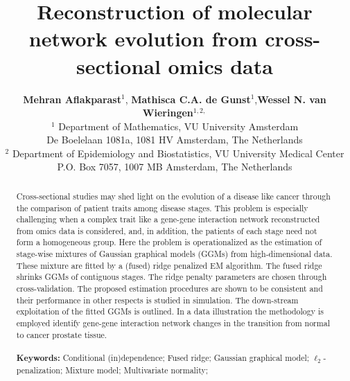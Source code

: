 \documentclass[10pt]{article}
\title{Reconstruction of molecular network evolution from cross-sectional omics data}
\author{ {\small
\textbf{Mehran Aflakparast}$^{1}$, \textbf{Mathisca C.A. de Gunst}$^{1}$,\textbf{Wessel N. van Wieringen}$^{1,2,}$%
}
\\
{\small $^1$ Department of Mathematics, VU University Amsterdam}
\\
{\small De Boelelaan 1081a, 1081 HV Amsterdam, The Netherlands}
\\
{\small $^2$ Department of Epidemiology and Biostatistics, VU University Medical Center}
\\
{\small P.O. Box 7057, 1007 MB Amsterdam, The Netherlands}
}
\date{}
\begin{document}
\maketitle


\begin{abstract}
\noindent
Cross-sectional studies may shed light on the evolution of a disease like cancer through the comparison of patient traits among disease stages. 
This problem is especially challenging when a complex trait like a gene-gene interaction network reconstructed from omics data is considered, and, in addition, the patients of each stage need not form a homogeneous group. Here the problem is operationalized as the estimation of stage-wise mixtures of Gaussian graphical models (GGMs) from high-dimensional data. These mixture are fitted by a (fused) ridge penalized EM algorithm. The fused ridge shrinks GGMs of contiguous stages. The ridge penalty parameters are chosen through cross-validation. The proposed estimation procedures are shown to be consistent and their performance in other respects is studied in simulation. The down-stream exploitation of the fitted GGMs is outlined. In a data illustration the methodology is employed identify gene-gene interaction network changes in the transition from normal to cancer prostate tissue.
\\
\\
{\bf Keywords:}  Conditional (in)dependence; Fused ridge; Gaussian graphical model; $\ell_2$-penalization; Mixture model; Multivariate normality;
\end{abstract}



\end{document}
